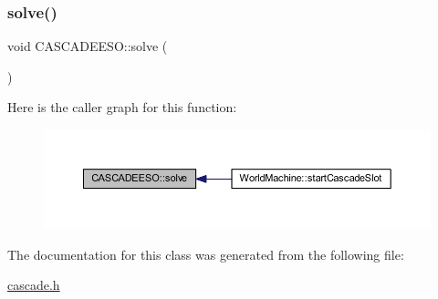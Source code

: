 \subsubsection{\texorpdfstring{solve()}{solve()}}
{\footnotesize\ttfamily void C\+A\+S\+C\+A\+D\+E\+E\+S\+O\+::solve (\begin{DoxyParamCaption}{ }\end{DoxyParamCaption})\hspace{0.3cm}{\ttfamily [inline]}}

Here is the caller graph for this function\+:\nopagebreak
\begin{figure}[H]
\begin{center}
\leavevmode
\includegraphics[width=350pt]{class_c_a_s_c_a_d_e_e_s_o_a87ddbb1f74cbb26db6dafa7d780ed7e9_icgraph}
\end{center}
\end{figure}


The documentation for this class was generated from the following file\+:\begin{DoxyCompactItemize}
\item 
\mbox{\hyperlink{cascade_8h}{cascade.\+h}}\end{DoxyCompactItemize}
